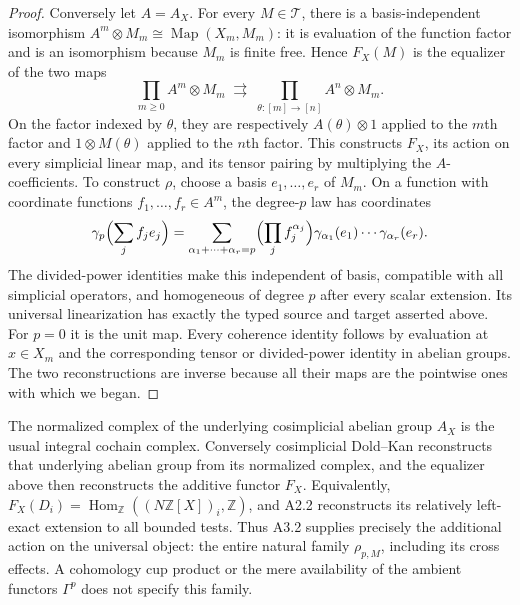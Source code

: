 \begin{proof}
Conversely let $A=A_X$. For every $M\in\mathcal T$, there is a
basis-independent isomorphism
$A^m\otimes M_m\cong\operatorname{Map}(X_m,M_m)$: it is evaluation
of the function factor and is an isomorphism because $M_m$ is finite
free. Hence $F_X(M)$ is the equalizer of the two maps
\[
 \prod_{m\geq0} A^m\otimes M_m
 \;\rightrightarrows\;
 \prod_{\theta:[m]\to[n]} A^n\otimes M_m.
\]
On the factor indexed by $\theta$, they are respectively
$A(\theta)\otimes1$ applied to the $m$th factor and
$1\otimes M(\theta)$ applied to the $n$th factor. This constructs
$F_X$, its action on every simplicial linear map, and its tensor
pairing by multiplying the $A$-coefficients. To construct $\rho$, choose
a basis $e_1,\dots,e_r$ of $M_m$. On a function with coordinate
functions $f_1,\dots,f_r\in A^m$, the degree-$p$ law has coordinates
\[
 \gamma_p\Bigl(\sum_j f_j e_j\Bigr)
 =\sum_{\alpha_1+\cdots+\alpha_r=p}
    \Bigl(\prod_j f_j^{\alpha_j}\Bigr)
    \gamma_{\alpha_1}(e_1)\cdots\gamma_{\alpha_r}(e_r).
\]
The divided-power identities make this independent of basis, compatible
with all simplicial operators, and homogeneous of degree $p$ after
every scalar extension. Its universal linearization has exactly the
typed source and target asserted above. For $p=0$ it is the unit map.
Every coherence identity follows by evaluation at $x\in X_m$ and the
corresponding tensor or divided-power identity in abelian groups.
The two reconstructions are inverse because all their maps are the
pointwise ones with which we began.
\end{proof}

The normalized complex of the underlying cosimplicial abelian group
$A_X$ is the usual integral cochain complex. Conversely cosimplicial
Dold--Kan reconstructs that underlying abelian group from its normalized
complex, and the equalizer above then reconstructs the additive functor
$F_X$. Equivalently, $F_X(D_i)=\operatorname{Hom}_{\mathbb Z}
((N\mathbb Z[X])_i,\mathbb Z)$, and A2.2 reconstructs its relatively
left-exact extension to all bounded tests. Thus A3.2 supplies precisely
the additional action on the universal object: the entire natural
family $\rho_{p,M}$, including its cross effects. A cohomology cup
product or the mere availability of the ambient functors $\Gamma^p$
does not specify this family.

